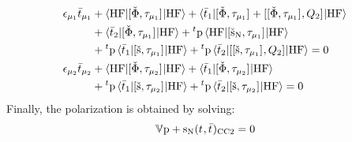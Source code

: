 \begin{subequations}\label{eq:pted-cc2-multipliers}
  \begin{align}
    \epsilon_{\mu_1}\bar{t}_{\mu_1} &+
     \braket{\mathrm{HF} | [ \check{\Phi}, \tau_{\mu_1} ]^{} | \mathrm{HF}}
   + \braket{\bar{t}_{1} |
       [ \check{\Phi}, \tau_{\mu_1} ]^{}
     + [ [ \check{\Phi}, \tau_{\mu_1} ]^{}, Q_2 ]^{}
     | \mathrm{HF}} \nonumber \\
   &+ \braket{\bar{t}_{2} | [ \check{\Phi}, \tau_{\mu_1} ]^{} |
   \mathrm{HF}}
   + {}^t\mathrm{p}\braket{\mathrm{HF} |
   [ \check{\mathrm{s}}_\mathrm{N}, \tau_{\mu_1} ]^{} | \mathrm{HF}}  \nonumber \\
   &+ {}^t\mathrm{p}\braket{\bar{t}_{1} | [ \check{\mathrm{s}}, \tau_{\mu_1} ]^{} | \mathrm{HF}}
   + {}^t\mathrm{p}\braket{\bar{t}_{2} | [ [ \check{\mathrm{s}}, \tau_{\mu_1} ]^{}, Q_2 ]^{} | \mathrm{HF}}
   = 0 \label{eq:pted-cc2-singles-multipliers} \\
    \epsilon_{\mu_2}\bar{t}_{\mu_2} &+
    \braket{\mathrm{HF} | [ \check{\Phi}, \tau_{\mu_2} ]^{} | \mathrm{HF}}
   + \braket{\bar{t}_{1} |
       [ \check{\Phi}, \tau_{\mu_2} ]^{}
     | \mathrm{HF}} \nonumber \\
   &+ {}^t\mathrm{p}\braket{\bar{t}_{1} | [ \check{\mathrm{s}}, \tau_{\mu_2} ]^{} | \mathrm{HF}}
   + {}^t\mathrm{p}\braket{\bar{t}_{2} | [ \check{\mathrm{s}}, \tau_{\mu_2} ]^{} | \mathrm{HF}}
     = 0 \label{eq:pted-cc2-doubles-multipliers}
  \end{align}
\end{subequations}
Finally, the polarization is obtained by solving:
\begin{equation}\label{eq:pted-cc2-polarization}
  \mathbb{V}\mathrm{p} + \mathrm{s}_{\mathrm{N}}(t_{},\bar{t}_{})_\mathrm{CC2} = 0
\end{equation}


